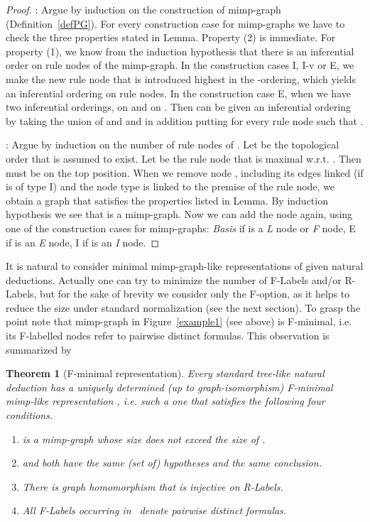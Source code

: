 \documentclass[submission,copyright,creativecommons]{eptcs}
\newtheorem{theorem}{Theorem}
\begin{document}
\begin{proof}

: Argue by induction on the construction of mimp-graph (Definition~\ref{defPG}). 
For every construction case for mimp-graphs we have to check the three properties 
stated in Lemma. Property (2) is immediate. For property (1), we know 
from the induction hypothesis that there is an inferential order  on rule 
nodes of the mimp-graph. In the construction cases I, I-v or E, we make the new rule node that is introduced highest in the -ordering, which yields an 
inferential ordering on rule nodes. 
In the construction case E, when we have two inferential 
orderings,  on  and  on . Then  
can be given an inferential ordering by taking the union of  and  
and in addition putting  for every rule node  such that  
.

: Argue by induction on the number of rule nodes of . 
Let  be the topological order that is assumed to exist. Let  
be the rule node that is maximal w.r.t. . Then  must be on 
the top position. When we remove node , including its edges 
linked (if  is of type I) and the node type   is linked to 
the premise of the rule node, we obtain a graph  that satisfies 
the properties listed in Lemma. By induction hypothesis we see 
that  is a mimp-graph. Now we can add the node  again, using one of 
the construction cases for mimp-graphs: {\em Basis} if  is a 
{\em L} node or {\em F} node, E if  is an {\em E} node, I if  is an {\em I} node.
\end{proof}

It is natural to consider minimal mimp-graph-like representations of given
natural deductions. Actually one can try to minimize the number of F-Labels
and/or R-Labels, but for the sake of brevity we consider only the F-option,
as it helps to reduce the size under standard normalization (see the next
section). To grasp the point note that mimp-graph in Figure~\ref{example1}
(see above) is F-minimal, i.e. its F-labelled nodes refer to pairwise
distinct formulas. This observation is summarized by

\begin{theorem}[F-minimal representation]\label{theo1}
Every standard tree-like natural deduction  has a uniquely
determined (up to graph-isomorphism) \emph{F-minimal mimp-like representation} , i.e. such a one that satisfies the following four conditions.

\begin{enumerate}
\item   is a mimp-graph whose size does not exceed the size of .

\item   and  both have the same (set of) hypotheses and the
same conclusion.

\item  There is graph homomorphism  that is
injective on R-Labels.

\item  All F-Labels occurring in \ denote pairwise distinct
formulas.
\end{enumerate}
\end{theorem}
\end{document}
